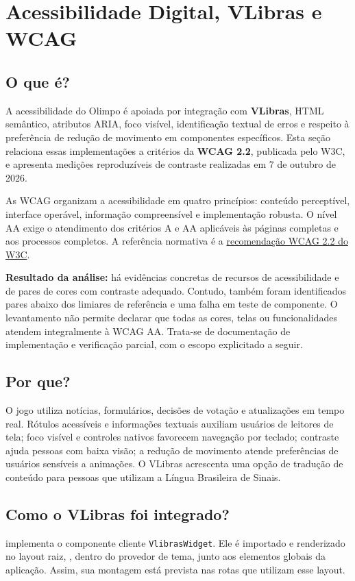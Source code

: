 \documentclass[12pt,a4paper]{article}
\begin{document}
\section{Acessibilidade Digital, VLibras e WCAG}
\label{sec:acessibilidade}
\begingroup
\sloppy

\subsection{O que é?}
A acessibilidade do Olimpo é apoiada por integração com \textbf{VLibras}, HTML semântico, atributos ARIA, foco visível, identificação textual de erros e respeito à preferência de redução de movimento em componentes específicos. Esta seção relaciona essas implementações a critérios da \textbf{WCAG 2.2}, publicada pelo W3C, e apresenta medições reproduzíveis de contraste realizadas em 7 de outubro de 2026.

As WCAG organizam a acessibilidade em quatro princípios: conteúdo perceptível, interface operável, informação compreensível e implementação robusta. O nível AA exige o atendimento dos critérios A e AA aplicáveis às páginas completas e aos processos completos. A referência normativa é a \href{https://www.w3.org/TR/WCAG22/}{recomendação WCAG 2.2 do W3C}.

\textbf{Resultado da análise:} há evidências concretas de recursos de acessibilidade e de pares de cores com contraste adequado. Contudo, também foram identificados pares abaixo dos limiares de referência e uma falha em teste de componente. O levantamento não permite declarar que todas as cores, telas ou funcionalidades atendem integralmente à WCAG AA. Trata-se de documentação de implementação e verificação parcial, com o escopo explicitado a seguir.

\subsection{Por que?}
O jogo utiliza notícias, formulários, decisões de votação e atualizações em tempo real. Rótulos acessíveis e informações textuais auxiliam usuários de leitores de tela; foco visível e controles nativos favorecem navegação por teclado; contraste ajuda pessoas com baixa visão; a redução de movimento atende preferências de usuários sensíveis a animações. O VLibras acrescenta uma opção de tradução de conteúdo para pessoas que utilizam a Língua Brasileira de Sinais.

\subsection{Como o VLibras foi integrado?}
 implementa o componente cliente \texttt{VlibrasWidget}. Ele é importado e renderizado no layout raiz, , dentro do provedor de tema, junto aos elementos globais da aplicação. Assim, sua montagem está prevista nas rotas que utilizam esse layout.
\end{document}
